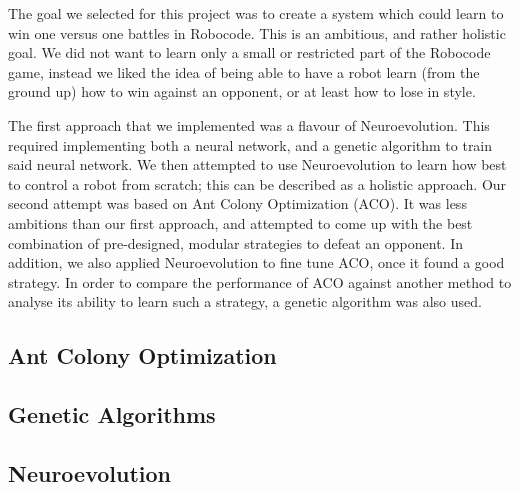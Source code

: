 The goal we selected for this project was to create a system which could learn to win one versus one battles in Robocode. This is an ambitious, and rather holistic goal. We did not want to learn only a small or restricted part of the Robocode game, instead we liked the idea of being able to have a robot learn (from the ground up) how to win against an opponent, or at least how to lose in style.

The first approach that we implemented was a flavour of Neuroevolution. This required implementing both a neural network, and a genetic algorithm to train said neural network. We then attempted to use Neuroevolution to learn how best to control a robot from scratch; this can be described as a holistic approach. Our second attempt was based on Ant Colony Optimization (ACO). It was less ambitions than our first approach, and attempted to come up with the best combination of pre-designed, modular strategies to defeat an opponent. In addition, we also applied Neuroevolution to fine tune ACO, once it found a good strategy. In order to compare the performance of ACO against another method to analyse its ability to learn such a strategy, a genetic algorithm was also used.


\subsection{Ant Colony Optimization}

\subsection{Genetic Algorithms}

\subsection{Neuroevolution}



